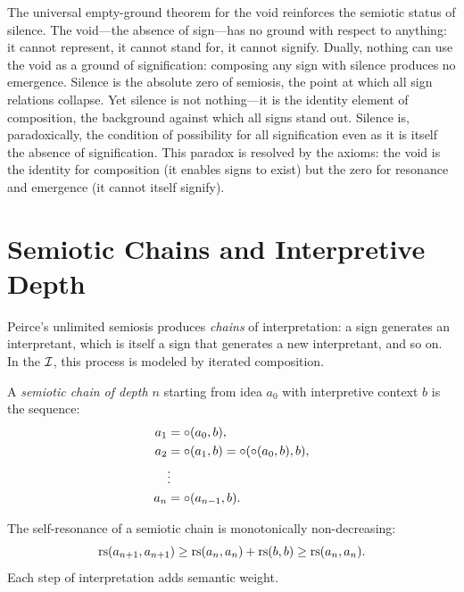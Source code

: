 \begin{interpretation}
The universal empty-ground theorem for the void reinforces the semiotic status of silence. The void---the absence of sign---has no ground with respect to anything: it cannot represent, it cannot stand for, it cannot signify. Dually, nothing can use the void as a ground of signification: composing any sign with silence produces no emergence. Silence is the absolute zero of semiosis, the point at which all sign relations collapse. Yet silence is not nothing---it is the identity element of composition, the background against which all signs stand out. Silence is, paradoxically, the condition of possibility for all signification even as it is itself the absence of signification. This paradox is resolved by the axioms: the void is the identity for composition (it enables signs to exist) but the zero for resonance and emergence (it cannot itself signify).
\end{interpretation}

\section{Semiotic Chains and Interpretive Depth}

Peirce's unlimited semiosis produces \emph{chains} of interpretation:
a sign generates an interpretant, which is itself a sign that generates
a new interpretant, and so on. In the $\mathcal{I}$, this process is modeled by
iterated composition.

\begin{definition}
\label{def:semiotic-chain}
A \emph{semiotic chain of depth $n$} starting from idea $a_0$ with
interpretive context $b$ is the sequence:
\begin{align*}
  a_1 &= \circ(a_0, b), \\
  a_2 &= \circ(a_1, b) = \circ(\circ(a_0, b), b), \\
  &\vdots \\
  a_n &= \circ(a_{n-1}, b).
\end{align*}
\end{definition}

\begin{theorem}
\label{thm:chain-enrichment}
The self-resonance of a semiotic chain is monotonically non-decreasing:
\[
  \mathrm{rs}(a_{n+1}, a_{n+1}) \geq \mathrm{rs}(a_n, a_n) + \mathrm{rs}(b, b)
  \geq \mathrm{rs}(a_n, a_n).
\]
Each step of interpretation adds semantic weight.
\end{theorem}

